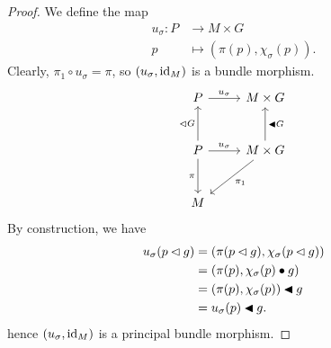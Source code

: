 \begin{proof}
    We define the map
    \begin{align*}
        u_\sigma : P &\to M \times G\\
                   p &\mapsto (\pi(p), \chi_\sigma(p)).
    \end{align*}
    Clearly, \(\pi_1 \circ u_\sigma = \pi\), so \((u_\sigma, \operatorname{id}_{M})\) is a bundle morphism.
    \begin{equation*}
        \begin{tikzcd}[column sep = normal, row sep = large]
            P \arrow{r}{u_\sigma} &M\times G\\
            P \arrow{u}{\ract G} \arrow[swap]{d}{\pi} \arrow{r}{u_\sigma} & M \times G \arrow[swap]{u}{\ractalt G} \arrow{ld}{\pi_1}\\
            M
        \end{tikzcd}
    \end{equation*}
    By construction, we have
    \begin{align*}
        u_\sigma(p \mathbin{\vartriangleleft} g) &= (\pi(p \mathbin{\vartriangleleft} g), \chi_\sigma(p \mathbin{\vartriangleleft} g))\\
                            &= (\pi(p), \chi_\sigma(p) \bullet g)\\
                            &= (\pi(p), \chi_\sigma(p)) \mathbin{\blacktriangleleft} g\\
                            &= u_\sigma(p) \mathbin{\blacktriangleleft} g.
    \end{align*}
    hence \((u_\sigma, \operatorname{id}_{M})\) is a principal bundle morphism.
\end{proof}

